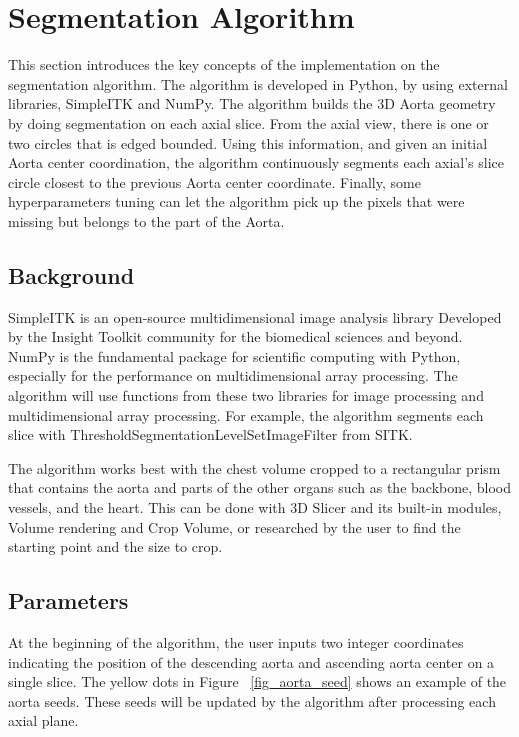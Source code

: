 \section{Segmentation Algorithm}

This section introduces the key concepts of the implementation on the segmentation algorithm. The algorithm is developed in Python, by using external libraries, SimpleITK and NumPy. The algorithm builds the 3D Aorta geometry by doing segmentation on each axial slice. From the axial view, there is one or two circles that is edged bounded. Using this information, and given an initial Aorta center coordination, the algorithm continuously segments each axial's slice circle closest to the previous Aorta center coordinate. Finally, some hyperparameters tuning can let the algorithm pick up the pixels that were missing but belongs to the part of the Aorta.

\subsection{Background} \label{algo_bg}

SimpleITK is an open-source multidimensional image analysis library Developed by the Insight Toolkit community for the biomedical sciences and beyond. NumPy is the fundamental package for scientific computing with Python, especially for the performance on multidimensional array processing. The algorithm will use functions from these two libraries for image processing and multidimensional array processing. For example, the algorithm segments each slice with ThresholdSegmentationLevelSetImageFilter from SITK.

The algorithm works best with the chest volume cropped to a rectangular prism that contains the aorta and parts of the other organs such as the backbone, blood vessels, and the heart. This can be done with 3D Slicer and its built-in modules, Volume rendering and Crop Volume, or researched by the user to find the starting point and the size to crop.

\subsection{Parameters}

At the beginning of the algorithm, the user inputs two integer coordinates indicating the position of the descending aorta and ascending aorta center on a single slice. The yellow dots in Figure ~\ref{fig_aorta_seed} shows an example of the aorta seeds. These seeds will be updated by the algorithm after processing each axial plane.

